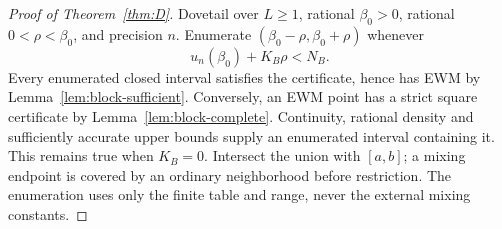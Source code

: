 \begin{proof}[Proof of Theorem~\ref{thm:D}]
Dovetail over \(L\ge1\), rational \(\beta_0>0\), rational \(0<\rho<\beta_0\), and precision \(n\). Enumerate \((\beta_0-\rho,\beta_0+\rho)\) whenever
\[
u_n(\beta_0)+K_B\rho<N_B.
\]
Every enumerated closed interval satisfies the certificate, hence has EWM by Lemma~\ref{lem:block-sufficient}. Conversely, an EWM point has a strict square certificate by Lemma~\ref{lem:block-complete}. Continuity, rational density and sufficiently accurate upper bounds supply an enumerated interval containing it. This remains true when \(K_B=0\). Intersect the union with \([a,b]\); a mixing endpoint is covered by an ordinary neighborhood before restriction. The enumeration uses only the finite table and range, never the external mixing constants.
\end{proof}
